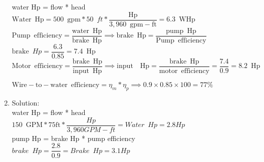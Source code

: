 \begin{enumerate}
water Hp = flow * head\\
 \vspace{0.2cm}
$\mathrm{Water} \enspace \mathrm{Hp} = 500 \enspace \mathrm{gpm}*50 \enspace ft*\dfrac{\mathrm{Hp}}{3,960 \enspace \mathrm{gpm-ft}}=\boxed{ 6.3 \enspace \mathrm{WHp}}$\\ 
  \vspace{0.2cm}
$\mathrm{Pump \enspace efficiency} =\dfrac{\mathrm{water \enspace Hp}}{\mathrm{brake \enspace Hp}} \implies \mathrm{brake \enspace Hp}=\dfrac{\mathrm{pump \enspace Hp}}{\mathrm{Pump \enspace efficiency}}$ \\
  \vspace{0.2cm}
$\textrm{brake} \enspace Hp = \dfrac{6.3}{0.85}=\boxed{7.4 \enspace \mathrm{Hp}}$\\
  \vspace{0.2cm}
$\mathrm{Motor \enspace efficiency} =\dfrac{\mathrm{brake \enspace Hp}}{\mathrm{input \enspace Hp}} \implies \mathrm{input \enspace \enspace Hp}=\dfrac{\mathrm{brake \enspace Hp}}{\mathrm{motor \enspace efficiency}}= \dfrac{7.4}{0.9}=\boxed{8.2 \enspace \mathrm{Hp}}$\\
  \vspace{0.2cm}
  
 \vspace{0.2cm}
$\mathrm{Wire-to-water} \enspace \mathrm{efficiency}=\eta_m * \eta_p \implies 0.9 \times 0.85 \times 100=\boxed{77 \%}$

\item  Solution:\\
\vspace{0.4cm}
water Hp = flow * head\\
$150 \enspace \mathrm{GPM}*75\mathrm{ft}*\dfrac{Hp}{3,960 GPM-ft}=\boxed{Water \enspace Hp = 2.8Hp}$\\
\vspace{0.4cm}
pump Hp = brake Hp * pump efficiency\\
$brake \enspace Hp = \dfrac{2.8}{0.9}=\boxed{Brake \enspace Hp=3.1Hp}$
 \vspace{0.2cm}

\end{enumerate}






